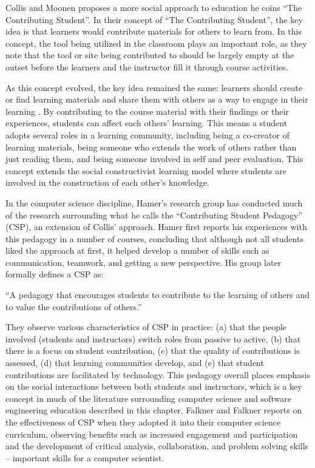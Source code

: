 \begin{itemize}
Collis and Moonen \cite{collis2001flexible} proposes a more social approach to education he coins ``The Contributing Student''. In their concept of ``The Contributing Student'', the key idea is that learners would contribute materials for others to learn from. In this concept, the tool being utilized in the classroom plays an important role, as they note that the tool or site being contributed to should be largely empty at the outset before the learners and the instructor fill it through course activities.

As this concept evolved, the key idea remained the same: learners should create or find learning materials and share them with others as a way to engage in their learning \cite{collis2006contributing}. By contributing to the course material with their findings or their experiences, students can affect each others' learning. This means a student adopts several roles in a learning community, including being a co-creator of learning materials, being someone who extends the work of others rather than just reading them, and being someone involved in self and peer evaluation. This concept extends the social constructivist learning model where students are involved in the construction of each other’s knowledge.

In the computer science discipline, Hamer’s research group has conducted much of the research surrounding what he calls the ``Contributing Student Pedagogy'' (CSP), an extension of Collis’ approach. Hamer first reports his experiences \cite{hamer2006some} with this pedagogy in a number of courses, concluding that although not all students liked the approach at first, it helped develop a number of skills such as communication, teamwork, and getting a new perspective. His group later formally defines a CSP \cite{hamer2008contributing} as:

``A pedagogy that encourages students to contribute to the learning of others and to value the contributions of others.''

They observe various characteristics of CSP in practice: (a) that the people involved (students and instructors) switch roles from passive to active, (b) that there is a focus on student contribution, (c) that the quality of contributions is assessed, (d) that learning communities develop, and (e) that student contributions are facilitated by technology. This pedagogy overall places emphasis on the social interactions between both students and instructors, which is a key concept in much of the literature surrounding computer science and software engineering education described in this chapter. Falkner and Falkner \cite{falkner2012supporting} reports on the effectiveness of CSP when they adopted it into their computer science curriculum, observing benefits such as increased engagement and participation and the development of critical analysis, collaboration, and problem solving skills – important skills for a computer scientist.


\end{itemize}
